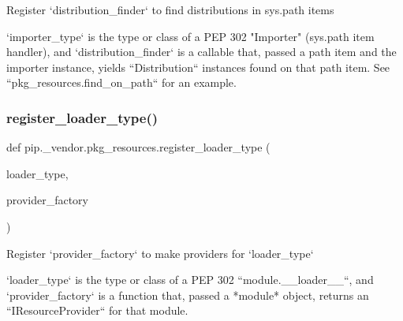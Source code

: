 \begin{DoxyVerb}Register `distribution_finder` to find distributions in sys.path items

`importer_type` is the type or class of a PEP 302 "Importer" (sys.path item
handler), and `distribution_finder` is a callable that, passed a path
item and the importer instance, yields ``Distribution`` instances found on
that path item.  See ``pkg_resources.find_on_path`` for an example.\end{DoxyVerb}
 \mbox{\label{namespacepip_1_1__vendor_1_1pkg__resources_ac15df9eeda704ffb4382ff13f2dfdc1a}} 
\subsubsection{\texorpdfstring{register\+\_\+loader\+\_\+type()}{register\_loader\_type()}}
{\footnotesize\ttfamily def pip.\+\_\+vendor.\+pkg\+\_\+resources.\+register\+\_\+loader\+\_\+type (\begin{DoxyParamCaption}\item[{}]{loader\+\_\+type,  }\item[{}]{provider\+\_\+factory }\end{DoxyParamCaption})}

\begin{DoxyVerb}Register `provider_factory` to make providers for `loader_type`

`loader_type` is the type or class of a PEP 302 ``module.__loader__``,
and `provider_factory` is a function that, passed a *module* object,
returns an ``IResourceProvider`` for that module.
\end{DoxyVerb}
 \mbox{\label{namespacepip_1_1__vendor_1_1pkg__resources_aa03be37380c727d1599bfd637181056e}} 
